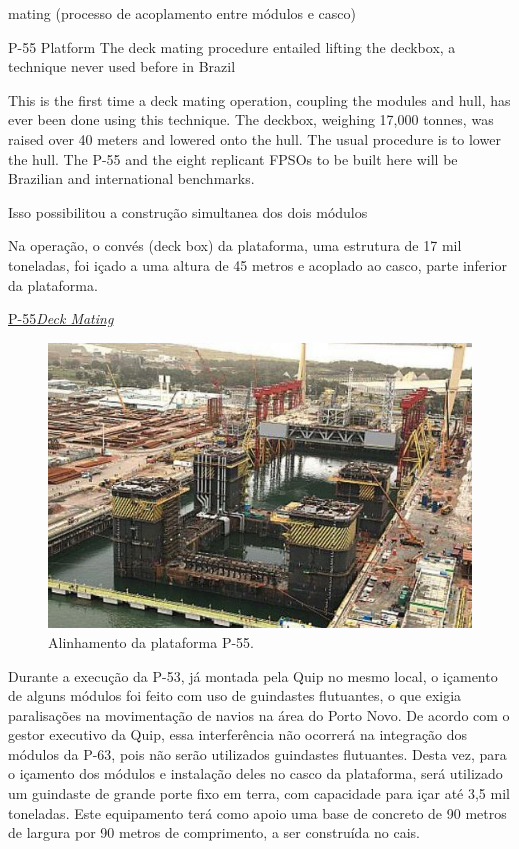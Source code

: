 mating (processo de acoplamento entre módulos e casco)

P-55 Platform
The deck mating procedure entailed lifting the deckbox, a technique never used
before in Brazil

This is the first time a deck mating operation, coupling the modules and hull,
has ever been done using this technique. The deckbox, weighing 17,000 tonnes, 
was raised over 40 meters and lowered onto the hull. The usual procedure is to 
lower the hull. The P-55 and the eight replicant FPSOs to be built here will be 
Brazilian and international benchmarks.

Isso possibilitou a construção simultanea dos dois módulos

Na operação, o convés (deck box) da plataforma, uma estrutura de 17 mil
toneladas, foi içado a uma altura de 45 metros e acoplado ao casco, parte inferior da plataforma.

\href{http://www.offshoreenergytoday.com/brazils-petrobras-completes-deck-mating-on-p-55-platform/}{P-55\textit{Deck
Mating}}

\begin{figure}[h!]
    \centering
    \includegraphics[width=0.9\columnwidth]{figs/mating/P55}
    \caption{Alinhamento da plataforma P-55.}
    \label{P55}
\end{figure} 

Durante a execução da P-53, já montada pela Quip no mesmo local, o içamento de
alguns módulos foi feito com uso de guindastes flutuantes, o que exigia paralisações 
na movimentação de navios na área do Porto Novo. De acordo com o gestor
executivo da Quip, essa interferência não ocorrerá na integração dos módulos da P-63, 
pois não serão utilizados guindastes flutuantes. Desta vez, para o içamento dos módulos 
e instalação deles no casco da plataforma, será utilizado um guindaste de grande porte 
fixo em terra, com capacidade para içar até 3,5 mil toneladas. Este equipamento terá como 
apoio uma base de concreto de 90 metros de largura por 90 metros de comprimento, a ser construída 
no cais. 

